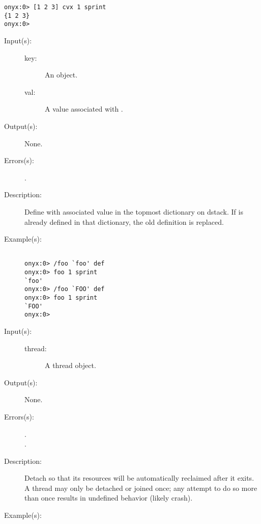 \begin{description}
\begin{description}
\begin{verbatim}
onyx:0> [1 2 3] cvx 1 sprint
{1 2 3}
onyx:0>
		\end{verbatim}
	\end{description}
\label{systemdict:def}
\item[{\onyxop{key val}{def}{--}}: ]
	\begin{description}\item[]
	\item[Input(s): ]
		\begin{description}\item[]
		\item[key: ]
			An object.
		\item[val: ]
			A value associated with .
		\end{description}
	\item[Output(s): ] None.
	\item[Errors(s): ]
		\begin{description}\item[]
		\item[.]
		\end{description}
	\item[Description: ]
		Define  with associated value  in the
		topmost dictionary on dstack.  If  is already defined
		in that dictionary, the old definition is replaced.
	\item[Example(s): ]\begin{verbatim}

onyx:0> /foo `foo' def
onyx:0> foo 1 sprint
`foo'
onyx:0> /foo `FOO' def
onyx:0> foo 1 sprint
`FOO'
onyx:0>
		\end{verbatim}
	\end{description}
\label{systemdict:detach}
\item[{\onyxop{thread}{detach}{--}}: ]
	\begin{description}\item[]
	\item[Input(s): ]
		\begin{description}\item[]
		\item[thread: ]
			A thread object.
		\end{description}
	\item[Output(s): ] None.
	\item[Errors(s): ]
		\begin{description}\item[]
		\item[.]
		\item[.]
		\end{description}
	\item[Description: ]
		Detach  so that its resources will be
		automatically reclaimed after it exits.  A thread may only be
		detached or joined once; any attempt to do so more than once
		results in undefined behavior (likely crash).
	\item[Example(s): ]\begin{verbatim}


\end{verbatim}
\end{description}
\end{description}
